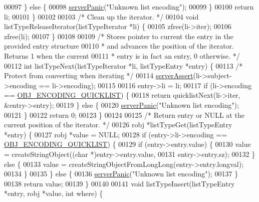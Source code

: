 \begin{DoxyCode}
00097     \} \textcolor{keywordflow}{else} \{
00098         \hyperlink{server_8h_a11cc378e7778a830b41240578de3b204}{serverPanic}(\textcolor{stringliteral}{"Unknown list encoding"});
00099     \}
00100     \textcolor{keywordflow}{return} li;
00101 \}
00102 
00103 \textcolor{comment}{/* Clean up the iterator. */}
00104 \textcolor{keywordtype}{void} listTypeReleaseIterator(listTypeIterator *li) \{
00105     zfree(li->iter);
00106     zfree(li);
00107 \}
00108 
00109 \textcolor{comment}{/* Stores pointer to current the entry in the provided entry structure}
00110 \textcolor{comment}{ * and advances the position of the iterator. Returns 1 when the current}
00111 \textcolor{comment}{ * entry is in fact an entry, 0 otherwise. */}
00112 \textcolor{keywordtype}{int} listTypeNext(listTypeIterator *li, listTypeEntry *entry) \{
00113     \textcolor{comment}{/* Protect from converting when iterating */}
00114     \hyperlink{server_8h_a88114b5169b4c382df6b56506285e56a}{serverAssert}(li->subject->encoding == li->encoding);
00115 
00116     entry->li = li;
00117     \textcolor{keywordflow}{if} (li->encoding == \hyperlink{server_8h_aec792aeed6d4bf83966672e6a23043b8}{OBJ\_ENCODING\_QUICKLIST}) \{
00118         \textcolor{keywordflow}{return} quicklistNext(li->iter, &entry->entry);
00119     \} \textcolor{keywordflow}{else} \{
00120         \hyperlink{server_8h_a11cc378e7778a830b41240578de3b204}{serverPanic}(\textcolor{stringliteral}{"Unknown list encoding"});
00121     \}
00122     \textcolor{keywordflow}{return} 0;
00123 \}
00124 
00125 \textcolor{comment}{/* Return entry or NULL at the current position of the iterator. */}
00126 robj *listTypeGet(listTypeEntry *entry) \{
00127     robj *value = NULL;
00128     \textcolor{keywordflow}{if} (entry->li->encoding == \hyperlink{server_8h_aec792aeed6d4bf83966672e6a23043b8}{OBJ\_ENCODING\_QUICKLIST}) \{
00129         \textcolor{keywordflow}{if} (entry->entry.value) \{
00130             value = createStringObject((\textcolor{keywordtype}{char} *)entry->entry.value,
00131                                        entry->entry.sz);
00132         \} \textcolor{keywordflow}{else} \{
00133             value = createStringObjectFromLongLong(entry->entry.longval);
00134         \}
00135     \} \textcolor{keywordflow}{else} \{
00136         \hyperlink{server_8h_a11cc378e7778a830b41240578de3b204}{serverPanic}(\textcolor{stringliteral}{"Unknown list encoding"});
00137     \}
00138     \textcolor{keywordflow}{return} value;
00139 \}
00140 
00141 \textcolor{keywordtype}{void} listTypeInsert(listTypeEntry *entry, robj *value, \textcolor{keywordtype}{int} where) \{

\end{DoxyCode}
